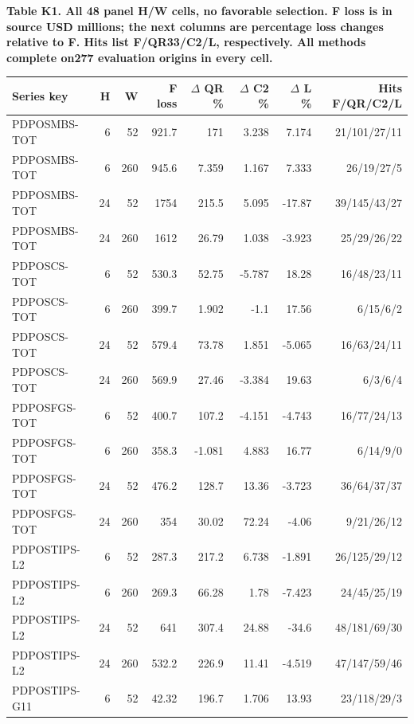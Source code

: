 \documentclass[10pt,a4paper]{article}
\begin{document}
\begin{center}
\begin{minipage}{\linewidth}
\small\textbf{Table K1. All 48 panel H/W cells, no favorable selection. F loss is in source USD millions; the next columns are percentage loss changes relative to F. Hits list F/QR33/C2/L, respectively. All methods complete on277 evaluation origins in every cell.}\par\medskip
\centering\fontsize{8}{10}\selectfont
\begin{tabular}{lrrrrrrr}
\toprule
Series key & H & W & F loss & \(\Delta\) QR \% & \(\Delta\) C2 \% & \(\Delta\) L \% & Hits F/QR/C2/L \\
\midrule
PDPOSMBS-TOT & 6 & 52 & 921.7 & 171 & 3.238 & 7.174 & 21/101/27/11 \\
PDPOSMBS-TOT & 6 & 260 & 945.6 & 7.359 & 1.167 & 7.333 & 26/19/27/5 \\
PDPOSMBS-TOT & 24 & 52 & 1754 & 215.5 & 5.095 & -17.87 & 39/145/43/27 \\
PDPOSMBS-TOT & 24 & 260 & 1612 & 26.79 & 1.038 & -3.923 & 25/29/26/22 \\
PDPOSCS-TOT & 6 & 52 & 530.3 & 52.75 & -5.787 & 18.28 & 16/48/23/11 \\
PDPOSCS-TOT & 6 & 260 & 399.7 & 1.902 & -1.1 & 17.56 & 6/15/6/2 \\
PDPOSCS-TOT & 24 & 52 & 579.4 & 73.78 & 1.851 & -5.065 & 16/63/24/11 \\
PDPOSCS-TOT & 24 & 260 & 569.9 & 27.46 & -3.384 & 19.63 & 6/3/6/4 \\
PDPOSFGS-TOT & 6 & 52 & 400.7 & 107.2 & -4.151 & -4.743 & 16/77/24/13 \\
PDPOSFGS-TOT & 6 & 260 & 358.3 & -1.081 & 4.883 & 16.77 & 6/14/9/0 \\
PDPOSFGS-TOT & 24 & 52 & 476.2 & 128.7 & 13.36 & -3.723 & 36/64/37/37 \\
PDPOSFGS-TOT & 24 & 260 & 354 & 30.02 & 72.24 & -4.06 & 9/21/26/12 \\
PDPOSTIPS-L2 & 6 & 52 & 287.3 & 217.2 & 6.738 & -1.891 & 26/125/29/12 \\
PDPOSTIPS-L2 & 6 & 260 & 269.3 & 66.28 & 1.78 & -7.423 & 24/45/25/19 \\
PDPOSTIPS-L2 & 24 & 52 & 641 & 307.4 & 24.88 & -34.6 & 48/181/69/30 \\
PDPOSTIPS-L2 & 24 & 260 & 532.2 & 226.9 & 11.41 & -4.519 & 47/147/59/46 \\
PDPOSTIPS-G11 & 6 & 52 & 42.32 & 196.7 & 1.706 & 13.93 & 23/118/29/3 \\

\end{tabular}
\end{minipage}
\end{center}
\end{document}
